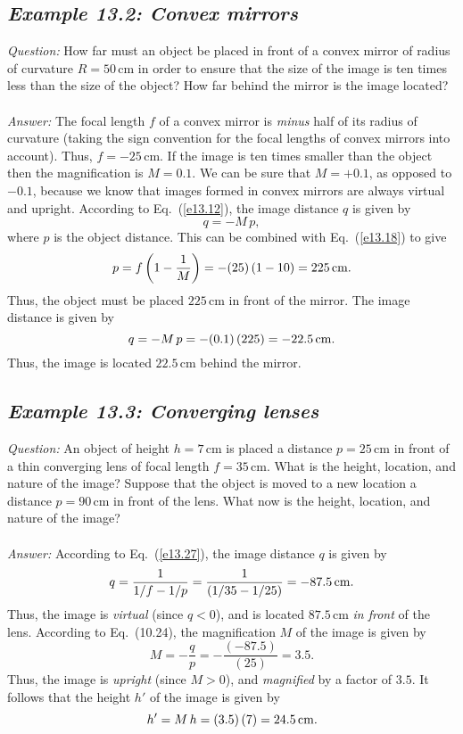 \subsection*{\em Example 13.2: Convex mirrors}
{\em Question:} How far must an object be
placed in front of a convex mirror
of radius of curvature $R=50$\,cm in order to ensure that the
size of the image is ten times less than the
size of the object? How far behind the
mirror is the image located?\\
~\\
{\em Answer:} The focal length $f$ of a convex mirror is {\em minus}
half of its radius of curvature (taking the sign convention for
the focal lengths of convex mirrors into account). Thus, $f=-25$\,cm.
If the image is ten times smaller than the object then the magnification
is 
$M=0.1$. We can be sure that $M=+0.1$, as opposed to $-0.1$, because
we know that images formed in convex mirrors are always virtual and
upright. 
According to Eq.~(\ref{e13.12}), the image  distance $q$
is given by
$$
q = - M\,p,
$$
where $p$ is the object distance. This can be combined with Eq.~(\ref{e13.18})
to give
$$
p = f\left(1-\frac{1}{M}\right) = -(25)\,(1-10) = 225\,{\rm cm}.
$$
Thus, the object must be placed $225$\,cm in front of the mirror. 
The image distance is given by
$$
q = -M\,p = -(0.1)\,(225) = -22.5\,{\rm cm}.
$$
Thus, the image is located $22.5$\,cm behind the mirror.


\subsection*{\em Example 13.3: Converging lenses}
{\em Question:} An object of height $h=7$\,cm is placed
a distance $p=25$\,cm in front of a thin converging lens of focal length
$f=35$\,cm. What is the height, location, and nature
of the image? Suppose that the object is moved to a
new location a distance $p=90$\,cm in front of the
lens. What now is the height, location, and nature of the image?\\
~\\
{\em Answer:} According to Eq.~(\ref{e13.27}), the image distance $q$ 
is given by 
$$
q = \frac{1}{1/f - 1/p} = \frac{1}{(1/35-1/25)} = - 87.5\,{\rm cm}.
$$
Thus, the image is {\em virtual}\/ (since $q<0$), and is located
$87.5$\,cm {\em in front}\/ of the lens. According to Eq.~(10.24),
the magnification $M$ of the image is given by
$$
M = -\frac{q}{p} = -\frac{(-87.5)}{(25)} = 3.5.
$$
Thus, the image is {\em upright}\/ (since $M>0$), and {\em magnified}\/
by a factor of $3.5$. It follows that the height $h'$ of the image
is given by
$$
h' = M\,h =(3.5)\,(7) =24.5\,{\rm cm}.
$$

